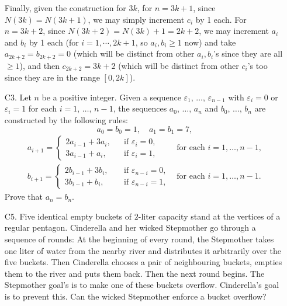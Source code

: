 \documentclass[11pt,a4paper]{article}
\begin{document}
\begin{enumerate}
        Finally, given the construction for $3k$, 
        for $n=3k+1$, since $N(3k)=N(3k+1)$, we may simply increment $c_i$ by 1 each. 
        For $n=3k+2$, since $N(3k + 2) = N(3k) + 1 = 2k+2$, 
        we may increment $a_i$ and $b_i$ by 1 each (for $i=1, \cdots, 2k+1$, so $a_i, b_i\ge 1$ now) and take $a_{2k+2}=b_{2k+2}=0$ (which will be distinct from other $a_i, b_i$'s since they are all $\ge 1$), and then $c_{2k+2}=3k+2$ 
        (which will be distinct from other $c_i$'s too since they are in the range $[0, 2k]$). 
        
        \item[C3.] 
        Let $n$ be a positive integer. Given a sequence $\varepsilon_1$, $\dots$, $\varepsilon_{n - 1}$ with $\varepsilon_i = 0$ or $\varepsilon_i = 1$ for each $i = 1$, $\dots$, $n - 1$, the sequences $a_0$, $\dots$, $a_n$ and $b_0$, $\dots$, $b_n$ are constructed by the following rules:\[a_0 = b_0 = 1, \quad a_1 = b_1 = 7,\]\[\begin{array}{lll}
        	a_{i+1} = 
        	\begin{cases}
        		2a_{i-1} + 3a_i, \\
        		3a_{i-1} + a_i, 
        	\end{cases} & 
        	\begin{array}{l} 
        		\text{if } \varepsilon_i = 0, \\  
        		\text{if } \varepsilon_i = 1, \end{array} 
        	& \text{for each } i = 1, \dots, n - 1, \\[15pt]
        	b_{i+1}= 
        	\begin{cases}
        		2b_{i-1} + 3b_i, \\
        		3b_{i-1} + b_i, 
        	\end{cases} & 
        	\begin{array}{l} 
        		\text{if } \varepsilon_{n-i} = 0, \\  
        		\text{if } \varepsilon_{n-i} = 1, \end{array} 
        	& \text{for each } i = 1, \dots, n - 1.
        \end{array}\]Prove that $a_n = b_n$.
        
    	
    	\item [C5.]
    	Five identical empty buckets of $2$-liter capacity stand at the vertices of a regular pentagon. Cinderella and her wicked Stepmother go through a sequence of rounds: At the beginning of every round, the Stepmother takes one liter of water from the nearby river and distributes it arbitrarily over the five buckets. Then Cinderella chooses a pair of neighbouring buckets, empties them to the river and puts them back. Then the next round begins. The Stepmother goal's is to make one of these buckets overflow. Cinderella's goal is to prevent this. Can the wicked Stepmother enforce a bucket overflow?
    	

\end{enumerate}
\end{document}
